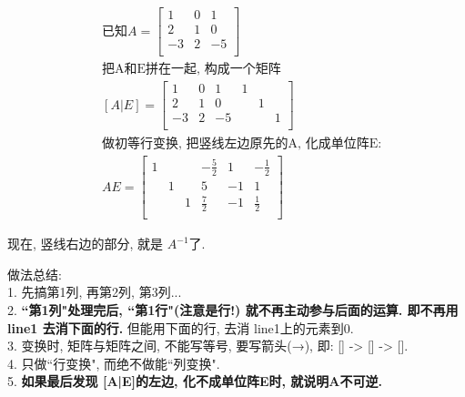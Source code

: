 \documentclass[UTF8]{ctexart}
\begin{document}
	\begin{myEnvSample}
		\begin{align*}
& \text{已知} A=\left[ \begin{matrix}
	1&		0&		1\\
	2&		1&		0\\
	-3&		2&		-5\\
\end{matrix} \right]  \\
& \text{把A和E拼在一起, 构成一个矩阵} \\
& [A|E]=\left[ \begin{array}{ccc|ccc}
	1&		0&		1&		1&		&		\\
	2&		1&		0&		&		1&		\\
	-3&		2&		-5&		&		&		1\\
\end{array} \right] \\
& \text{做初等行变换, 把竖线左边原先的A, 化成单位阵E:} \\
& AE=\left[ \begin{array}{ccc|ccc}
	1&		&		&		-\frac{5}{2}&		1&		-\frac{1}{2}\\
	&		1&		&		5&		-1&		1\\
	&		&		1&		\frac{7}{2}&		-1&		\frac{1}{2}\\
\end{array} \right]
		\end{align*}
	
		现在, 竖线右边的部分, 就是 $A^{-1}$了.
	\end{myEnvSample}
	
	
做法总结:\\

1. 先搞第1列, 再第2列, 第3列... \\
2. \textbf{``第1列"处理完后, ``第1行"(注意是行!) 就不再主动参与后面的运算. 即不再用 line1 去消下面的行.} 但能用下面的行, 去消 line1上的元素到0.\\
3. 变换时, 矩阵与矩阵之间, 不能写等号, 要写箭头(→), 即: [] -> [] -> [].\\
4. 只做``行变换", 而绝不做能``列变换".\\
5. \textbf{如果最后发现 [A|E]的左边, 化不成单位阵E时, 就说明A不可逆.}\\
	
\end{document}
